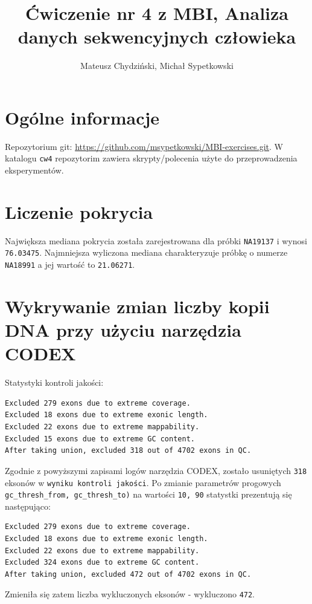 \documentclass[a4paper]{article}
\begin{document}
\title{Ćwiczenie nr 4 z MBI, Analiza danych sekwencyjnych człowieka}
\author{Mateusz Chydziński, Michał Sypetkowski}
\maketitle

\section{Ogólne informacje}
Repozytorium git: \url{https://github.com/msypetkowski/MBI-exercises.git}.
W katalogu \texttt{cw4} repozytorim zawiera skrypty/polecenia użyte do przeprowadzenia eksperymentów.


\section{Liczenie pokrycia}
Największa mediana pokrycia została zarejestrowana dla próbki \texttt{NA19137} i wynosi \texttt{76.03475}. Najmniejsza wyliczona
mediana charakteryzuje próbkę o numerze \texttt{NA18991} a jej wartość to \texttt{21.06271}.


\section{Wykrywanie zmian liczby kopii DNA przy użyciu narzędzia CODEX}
Statystyki kontroli jakości:
\begin{verbatim}
Excluded 279 exons due to extreme coverage.
Excluded 18 exons due to extreme exonic length.
Excluded 22 exons due to extreme mappability.
Excluded 15 exons due to extreme GC content.
After taking union, excluded 318 out of 4702 exons in QC.
\end{verbatim}
Zgodnie z powyższymi zapisami logów narzędzia CODEX, zostało usuniętych \texttt{318} eksonów w \texttt{wyniku kontroli jakości}.
Po zmianie parametrów progowych \texttt{gc\_thresh\_from, gc\_thresh\_to)} na wartości \texttt{10, 90} statystki prezentują się następująco:

\begin{verbatim}
Excluded 279 exons due to extreme coverage.
Excluded 18 exons due to extreme exonic length.
Excluded 22 exons due to extreme mappability.
Excluded 324 exons due to extreme GC content.
After taking union, excluded 472 out of 4702 exons in QC.
\end{verbatim}
Zmieniła się zatem liczba wykluczonych eksonów - wykluczono \texttt{472}.
\end{document}
